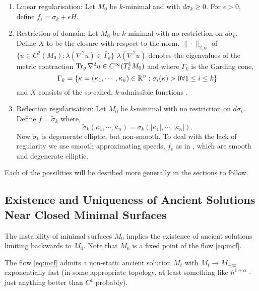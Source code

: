 \documentclass{amsart}
\begin{document}
\begin{enumerate}
\item Linear regularisation: Let \(M_0\) be \(k\)-minimal and with \(d\sigma_k \geq 0\). For \(\epsilon > 0\), define \(f_{\epsilon} = \sigma_k + \epsilon H\).
\item Restriction of domain: Let \(M_0\) be \(k\)-minimal with no restriction on \(d\sigma_k\). Define \(X\) to be the closure with respect to the \holder{} norm, \(\|\cdot\|_{2,\alpha}\) of \(\{u \in C^2(M_0) : \lambda(\nabla^2 u) \in \bar{\Gamma}_k\}\) \(\lambda(\nabla^2 u)\) denotes the eigenvalues of the metric contraction \(\operatorname{Tr}_g \nabla^2 u \in C^{\infty}(T^1_1 M_0)\) and where \(\Gamma_k\) is the Garding cone,
\[
\Gamma_k = \{\kappa = (\kappa_1, \cdots, \kappa_n) \in \mathbb{R}^n : \sigma_i(\kappa) > 0 \forall 1 \leq i \leq k\}
\]
and \(X\) consists of the so-called, \(k\)-admissible functions \cite[Section 2]{wang:/2009}.
\item Reflection regularisation: Let \(M_0\) be \(k\)-minimal with no restriction on \(d\sigma_k\). Define \(f = \tilde{\sigma}_k\) where,
\[
\tilde{\sigma}_k (\kappa_1, \cdots, \kappa_n) = \sigma_k(|\kappa_1|, \cdots, |\kappa_n|).
\]
Now \(\tilde{\sigma}_k\) is degenerate elliptic, but non-smooth. To deal with the lack of regularity we use smooth approximating speeds, \(f_{\epsilon}\) as in \cite{andrewsetal:/2014}, which are smooth and degenerate elliptic.
\end{enumerate}

Each of the possilities will be desribed more generally in the sections to follow.

\subsection{Existence and Uniqueness of Ancient Solutions Near Closed Minimal Surfaces}
\label{subsec:linearisation_existence}

The instability of minimal surfaces \(M_0\) implies the existence of ancient solutions limiting backwards to \(M_0\). Note that \(M_0\) is a fixed point of the flow \eqref{eq:mcf}.

\begin{thm}
\label{thm:ancient_existence}
The flow \eqref{eq:mcf} admits a non-static ancient solution \(M_t\) with \(M_t \to M_{-\infty}\) exponentially fast (in some appropriate topology, at least something like \(h^{1+\alpha}\) - just anything better than \(C^1\) probably).
\end{thm}
\end{document}
